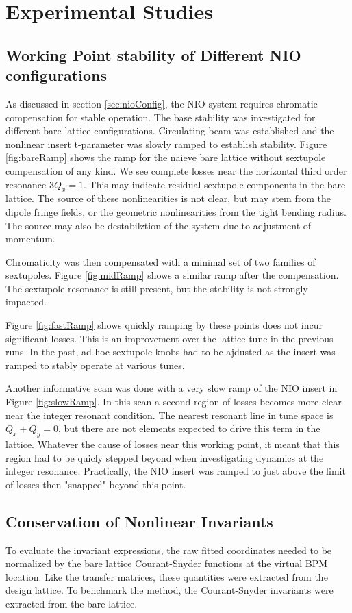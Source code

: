 \chapter{Experimental Studies} \label{chap:expResults}

\section{Working Point stability of Different NIO configurations} \label{sec:nioWorkPoint}
As discussed in section \ref{sec:nioConfig}, the NIO system requires chromatic compensation for stable operation. The base stability was investigated for different bare lattice configurations. Circulating beam was established and the nonlinear insert t-parameter was slowly ramped to establish stability. Figure \ref{fig:bareRamp} shows the ramp for the naieve bare lattice without sextupole compensation of any kind. We see complete losses near the horizontal third order resonance $3 Q_x = 1$. This may indicate residual sextupole components in the bare lattice. The source of these nonlinearities is not clear, but may stem from the dipole fringe fields, or the geometric nonlinearities from the tight bending radius. The source may also be destabilztion of the system due to adjustment of momentum.

Chromaticity was then compensated with a minimal set of two families of sextupoles. Figure \ref{fig:midRamp} shows a similar ramp after the compensation. The sextupole resonance is still present, but the stability is not strongly impacted.

Figure \ref{fig:fastRamp} shows quickly ramping by these points does not incur significant losses. This is an improvement over the lattice tune in the previous runs. In the past, ad hoc sextupole knobs had to be ajdusted as the insert was ramped to stably operate at various tunes.

Another informative scan was done with a very slow ramp of the NIO insert in Figure \ref{fig:slowRamp}. In this scan a second region of losses becomes more clear near the integer resonant condition. The nearest resonant line in tune space is $Q_x + Q_y = 0$, but there are not elements expected to drive this term in the lattice. Whatever the cause of losses near this working point, it meant that this region had to be quicly stepped beyond when investigating dynamics at the integer resonance. Practically, the NIO insert was ramped to just above the limit of losses then "snapped" beyond this point.

\section{Conservation of Nonlinear Invariants} \label{sec:invConv}
To evaluate the invariant expressions, the raw fitted coordinates needed to be normalized by the bare lattice Courant-Snyder functions at the virtual BPM location. Like the transfer matrices, these quantities were extracted from the design lattice. To benchmark the method, the Courant-Snyder invariants were extracted from the bare lattice. 

